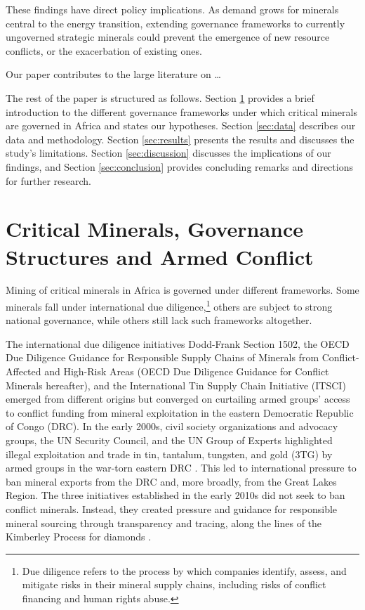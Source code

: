 \documentclass[11pt]{article}
\begin{document}
These findings have direct policy implications. As demand grows for minerals central to the energy transition, extending governance frameworks to currently ungoverned strategic minerals could prevent the emergence of new resource conflicts, or the exacerbation of existing ones.

Our paper contributes to the large literature on \ldots

The rest of the paper is structured as follows. Section \ref{sec:governance} provides a brief introduction to the different governance frameworks under which critical minerals are governed in Africa and states our hypotheses. Section \ref{sec:data} describes our data and methodology. Section \ref{sec:results} presents the results and discusses the study's limitations. Section \ref{sec:discussion} discusses the implications of our findings, and Section \ref{sec:conclusion} provides concluding remarks and directions for further research.

\section{Critical Minerals, Governance Structures and Armed Conflict}
\label{sec:governance}


Mining of critical minerals in Africa is governed under different frameworks. Some minerals fall under international due diligence,\footnote{Due diligence refers to the process by which companies identify, assess, and mitigate risks in their mineral supply chains, including risks of conflict financing and human rights abuse.} others are subject to strong national governance, while others still lack such frameworks altogether.

The international due diligence initiatives Dodd-Frank Section 1502, the OECD Due Diligence Guidance for Responsible Supply Chains of Minerals from Conflict-Affected and High-Risk Areas (OECD Due Diligence Guidance for Conflict Minerals hereafter), and the International Tin Supply Chain Initiative (ITSCI) emerged from different origins but converged on curtailing armed groups' access to conflict funding from mineral exploitation in the eastern Democratic Republic of Congo (DRC). In the early 2000s, civil society organizations and advocacy groups, the UN Security Council, and the UN Group of Experts highlighted illegal exploitation and trade in tin, tantalum, tungsten, and gold (3TG) by armed groups in the war-torn eastern DRC \citep{unsc2002panel, globalwitness2010gun, vogel2016terr}. This led to international pressure to ban mineral exports from the DRC and, more broadly, from the Great Lakes Region. The three initiatives established in the early 2010s did not seek to ban conflict minerals. Instead, they created pressure and guidance for responsible mineral sourcing through transparency and tracing, along the lines of the Kimberley Process for diamonds \citep{grant2012kimberley}.
\end{document}
